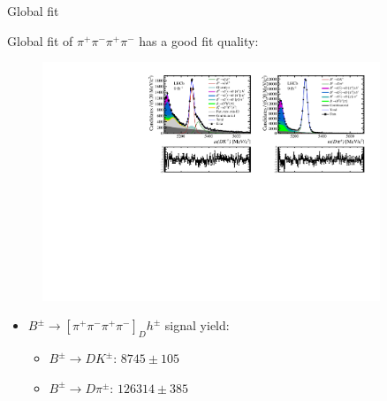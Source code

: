 \documentclass{beamer}
\begin{document}
\begin{frame}{Global fit}
  \begin{center}
    {\large Global fit of $\pi^+\pi^-\pi^+\pi^-$ has a good fit quality:}
  \end{center}
  \begin{figure}
    \centering
    \includegraphics[width = 0.9\textwidth,trim={0 0 0 0},clip=true]{Plots/d2pipipipi_fiveL_allDP.pdf}
  \end{figure}
  \vspace{-0.5cm}
  \begin{itemize}
    \item{$B^\pm\to[\pi^+\pi^-\pi^+\pi^-]_Dh^\pm$ signal yield:}
    \begin{itemize}
      \item{$B^\pm\to DK^\pm$: $8745 \pm 105$}
      \item{$B^\pm\to D\pi^\pm$: $126314 \pm 385$}
    \end{itemize}
  \end{itemize}
\end{frame}
\end{document}
